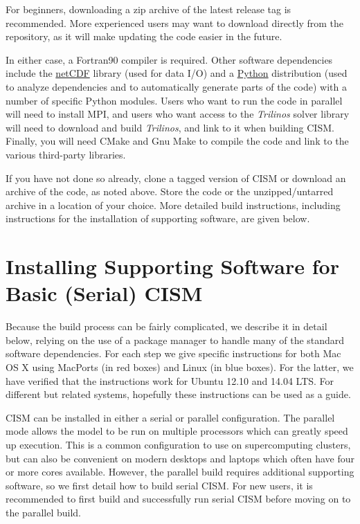 For beginners, downloading a zip archive of the latest release tag is recommended. 
More experienced users may want to download directly from the repository, 
as it will make updating the code easier in the future.

In either case, a Fortran90 compiler is required.  
Other software dependencies include the \href{http://www.unidata.ucar.edu/packages/netcdf/index.html}{netCDF} library 
(used for data I/O) and a \href{http://www.python.org}{Python} distribution 
(used to analyze dependencies and to automatically generate parts of the code) 
with a number of specific Python modules. Users who want to run the code in parallel will need to install MPI, 
and users who want access to the \textit{Trilinos} solver library will need to 
download and build \textit{Trilinos}, and link to it when building CISM. 
Finally, you will need CMake and Gnu Make to compile the code and link to the various third-party libraries. 

If you have not done so already, clone a tagged version of CISM or download an archive of the code, as noted above. Store the code or the unzipped/untarred archive in a location of your choice. More detailed build instructions, including instructions for the installation of supporting software, are given below.

\section{Installing Supporting Software for Basic (Serial) CISM}

Because the build process can be fairly complicated, we describe it in detail below, 
relying on the use of a package manager to handle many of the standard software dependencies. 
For each step we give specific instructions for both Mac OS X using MacPorts (in red boxes) and
Linux (in blue boxes). For the latter, we have verified that the instructions work for Ubuntu 12.10 and 14.04 LTS.
For different but related systems, hopefully these instructions can be used as a guide.

CISM can be installed in either a serial or parallel configuration. The parallel mode
allows the model to be run on multiple processors which can greatly speed up execution.
This is a common configuration to use on supercomputing clusters, but can also be 
convenient on modern desktops and laptops which often have four or more cores available.
However, the parallel build requires additional supporting software, so we first 
detail how to build serial CISM.  For new users, it is recommended to first build
and successfully run serial CISM before moving on to the parallel build.  

